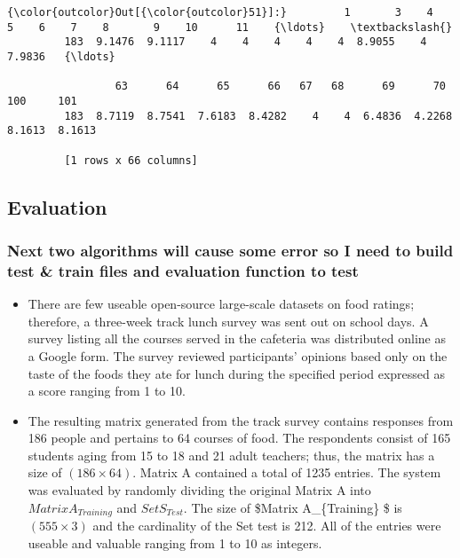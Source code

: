 \documentclass[11pt]{article}
\providecommand{\tightlist}{%
      \setlength{\itemsep}{0pt}\setlength{\parskip}{0pt}}
\begin{document}
            \begin{Verbatim}[commandchars=\\\{\}]
{\color{outcolor}Out[{\color{outcolor}51}]:}         1       3    4    5    6    7    8       9    10      11    {\ldots}    \textbackslash{}
         183  9.1476  9.1117    4    4    4    4    4  8.9055    4  7.9836   {\ldots}     
         
                 63      64      65      66   67   68      69      70      100     101  
         183  8.7119  8.7541  7.6183  8.4282    4    4  6.4836  4.2268  8.1613  8.1613  
         
         [1 rows x 66 columns]
\end{Verbatim}
        
    \subsection{Evaluation}\label{evaluation}

\subsubsection{Next two algorithms will cause some error so I need to
build test \& train files and evaluation function to
test}\label{next-two-algorithms-will-cause-some-error-so-i-need-to-build-test-train-files-and-evaluation-function-to-test}

\begin{itemize}
\tightlist
\item
  There are few useable open-source large-scale datasets on food
  ratings; therefore, a three-week track lunch survey was sent out on
  school days. A survey listing all the courses served in the cafeteria
  was distributed online as a Google form. The survey reviewed
  participants' opinions based only on the taste of the foods they ate
  for lunch during the specified period expressed as a score ranging
  from 1 to 10.
\item
  The resulting matrix generated from the track survey contains
  responses from 186 people and pertains to 64 courses of food. The
  respondents consist of 165 students aging from 15 to 18 and 21 adult
  teachers; thus, the matrix has a size of \((186 \times 64)\). Matrix A
  contained a total of 1235 entries. The system was evaluated by
  randomly dividing the original Matrix A into \(Matrix A_{Training}\)
  and \(Set S_{Test}\). The size of \$Matrix A\_\{Training\} \$ is
  \((555\times3)\) and the cardinality of the Set test is 212. All of
  the entries were useable and valuable ranging from 1 to 10 as
  integers.
\end{itemize}
\end{document}
